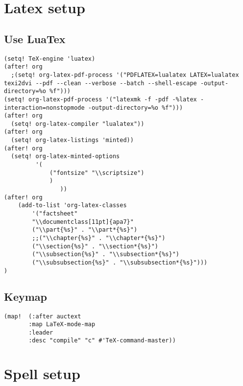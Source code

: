 \documentclass[11pt]{article}
\begin{document}
\section{Latex setup}
\label{sec:org303767a}
\subsection{Use LuaTex}
\label{sec:orga4ac0d3}
\begin{verbatim}
(setq! TeX-engine 'luatex)
(after! org
  ;(setq! org-latex-pdf-process '("PDFLATEX=lualatex LATEX=lualatex texi2dvi --pdf --clean --verbose --batch --shell-escape -output-directory=%o %f")))
(setq! org-latex-pdf-process '("latexmk -f -pdf -%latex -interaction=nonstopmode -output-directory=%o %f")))
(after! org
  (setq! org-latex-compiler "lualatex"))
(after! org
  (setq! org-latex-listings 'minted))
(after! org
  (setq! org-latex-minted-options
         '(
             ("fontsize" "\\scriptsize")
             )
                ))
(after! org
    (add-to-list 'org-latex-classes
        '("factsheet"
        "\\documentclass[11pt]{apa7}"
        ("\\part{%s}" . "\\part*{%s}")
        ;;("\\chapter{%s}" . "\\chapter*{%s}")
        ("\\section{%s}" . "\\section*{%s}")
        ("\\subsection{%s}" . "\\subsection*{%s}")
        ("\\subsubsection{%s}" . "\\subsubsection*{%s}")))
)
\end{verbatim}

\subsection{Keymap}
\label{sec:org61c1b3d}
\begin{verbatim}
(map!  (:after auctext
       :map LaTeX-mode-map
       :leader
       :desc "compile" "c" #'TeX-command-master))
\end{verbatim}

\section{Spell setup}
\label{sec:org669e450}
\end{document}
